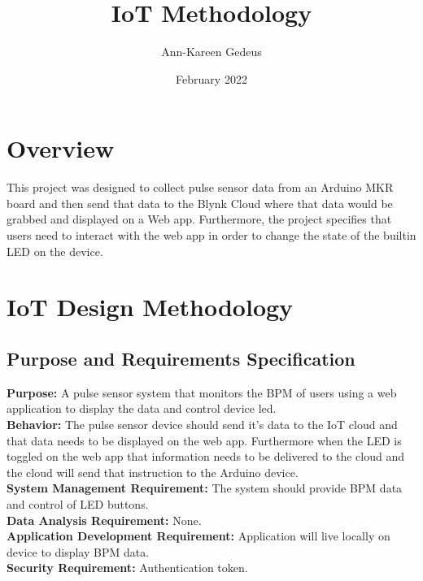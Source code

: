 \documentclass{report}
\title{IoT Methodology}
\author{Ann-Kareen Gedeus}
\date{February 2022}
\begin{document}
\maketitle

\section{Overview}
This project was designed to collect pulse sensor data from an Arduino MKR board and then send that data to the Blynk Cloud where that data would be grabbed and displayed on a Web app. Furthermore, the project specifies that users need to interact with the web app in order to change the state of the builtin LED on the device.


\section{IoT Design Methodology}
\subsection{Purpose and Requirements Specification}
\textbf{Purpose:} A pulse sensor system that monitors the BPM of users using a web application to display the data and control device led.\\
\textbf{Behavior:} The pulse sensor device should send it's data to the IoT cloud and that data needs to be displayed on the web app. Furthermore when the LED is toggled on the web app that information needs to be delivered to the cloud and the cloud will send that instruction to the Arduino device. \\
\textbf{System Management Requirement:} The system should provide BPM data and control of LED buttons. \\
\textbf{Data Analysis Requirement:} None. \\
\textbf{Application Development Requirement:} Application will live locally on device to display BPM data. \\
\textbf{Security Requirement:} Authentication token.
\end{document}
